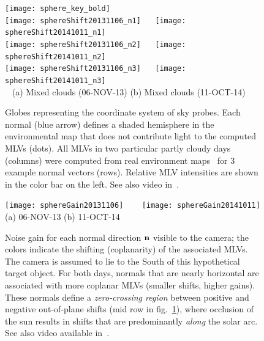 \begin{figure}[t]
\hspace{3.1cm} \texttt{[image: sphere\_key\_bold]} \\[-1mm]
\texttt{[image: sphereShift20131106\_n1]} \ \ %
\texttt{[image: sphereShift20141011\_n1]} \\[3mm]
\texttt{[image: sphereShift20131106\_n2]} \ \ %
\texttt{[image: sphereShift20141011\_n2]} \\[3mm]
\texttt{[image: sphereShift20131106\_n3]} \ \ %
\texttt{[image: sphereShift20141011\_n3]} \\[2mm]
{\footnotesize {\verb| |} \hspace{0.5cm} (a) Mixed clouds (06-NOV-13) \hspace{0.25cm} (b) Mixed clouds (11-OCT-14) }\\
\vspace{-2mm}
\caption{Globes representing the coordinate system of sky probes. Each normal (blue arrow) defines a shaded hemisphere in the environmental map that does not contribute light to the computed MLVs (dots). All MLVs in two particular partly cloudy days (columns) were computed from real environment maps~\cite{holdgeoffroy-iccp-15} for 3 example normal vectors (rows). Relative MLV intensities are shown in the color bar on the left. See also video in~\cite{webpageXhourPS}.}
\label{fig:realShiftNormal}
\vspace{-3mm}
\end{figure}%
\begin{figure}[!ht]
\centering
\texttt{[image: sphereGain20131106]} \ \ \ %
\texttt{[image: sphereGain20141011]} %
{\footnotesize {\verb| |} \hspace{.6cm} (a) 06-NOV-13 \hspace{1cm} (b) 11-OCT-14 }\\[3mm]
\vspace{-2mm}
\caption{Noise gain for each normal direction ${\bf n}$ visible to the camera; the colors indicate the shifting (coplanarity) of the associated MLVs. The camera is assumed to lie to the South of this hypothetical target object. For both days, normals that are nearly horizontal are associated with more coplanar MLVs (smaller shifts, higher gains). These normals define a {\em zero-crossing region} between positive and negative out-of-plane shifts (mid row in fig.~\ref{fig:realShiftNormal}), where occlusion of the sun results in shifts that are predominantly {\em along} the solar arc. See also video available in~\cite{webpageXhourPS}.}
\label{fig:realShiftAll}
\vspace{-3mm}
\end{figure}


